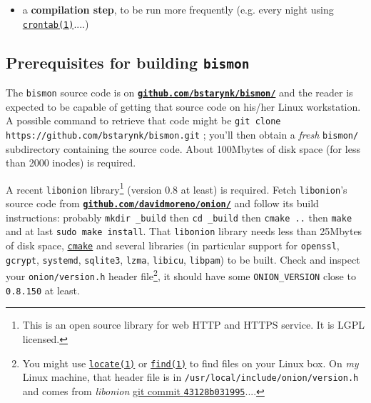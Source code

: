 \begin{appendices}
\begin{itemize}
\item a \textbf{compilation step}, to be run more frequently
  (e.g. every night using
  \href{https://man7.org/linux/man-pages/man1/crontab.1.html}{\texttt{crontab(1)}}....)

\end{itemize}

\medskip

\subsection{Prerequisites for building \texttt{bismon}}
\label{subsec:prereq-bismon}

The \texttt{bismon} source code is on
\href{https://github.com/bstarynk/bismon/}{\texttt{\textbf{github.com/bstarynk/bismon/}}}
and the reader is expected to be capable of getting that source code
on his/her Linux workstation. A possible command to retrieve that code
might be \texttt{git clone https://github.com/bstarynk/bismon.git} ;
you'll then obtain a \emph{fresh} \texttt{bismon/} subdirectory
containing the source code. About 100Mbytes of disk space (for less
than 2000 inodes) is required.

A recent \texttt{libonion} library\footnote{This is an open source
  library for web HTTP and HTTPS service. It is LGPL licensed.}
(version 0.8 at least) is required. Fetch \texttt{libonion}'s source
code from
\href{https://github.com/davidmoreno/onion}{\texttt{\textbf{github.com/davidmoreno/onion/}}}
and follow its build instructions: probably \texttt{mkdir \_build} then
\texttt{cd \_build} then \texttt{cmake ..} then \texttt{make} and at
last \texttt{sudo make install}. That \texttt{libonion} library needs
less than 25Mbytes of disk space,
\href{https://cmake.org}{\texttt{cmake}} and several libraries (in
particular support for \texttt{openssl}, \texttt{gcrypt},
\texttt{systemd}, \texttt{sqlite3}, \texttt{lzma}, \texttt{libicu},
\texttt{libpam}) to be built. Check and inspect your
\texttt{onion/version.h} header file\footnote{You might use
  \href{https://man7.org/linux/man-pages/man1/locate.1.html}{\texttt{locate(1)}}
  or
  \href{https://man7.org/linux/man-pages/man1/find.1.html}{\texttt{find(1)}}
  to find files on your Linux box. On \emph{my} Linux machine, that
  header file is in \texttt{/usr/local/include/onion/version.h} and
  comes from \emph{libonion}
  \href{https://github.com/davidmoreno/onion/commit/43128b03199518d4878074c311ff71ff0018aea8}{git
    commit \texttt{43128b031995}}....}, it should have some
\texttt{ONION\_VERSION} close to \texttt{0.8.150} at least.


\end{appendices}
